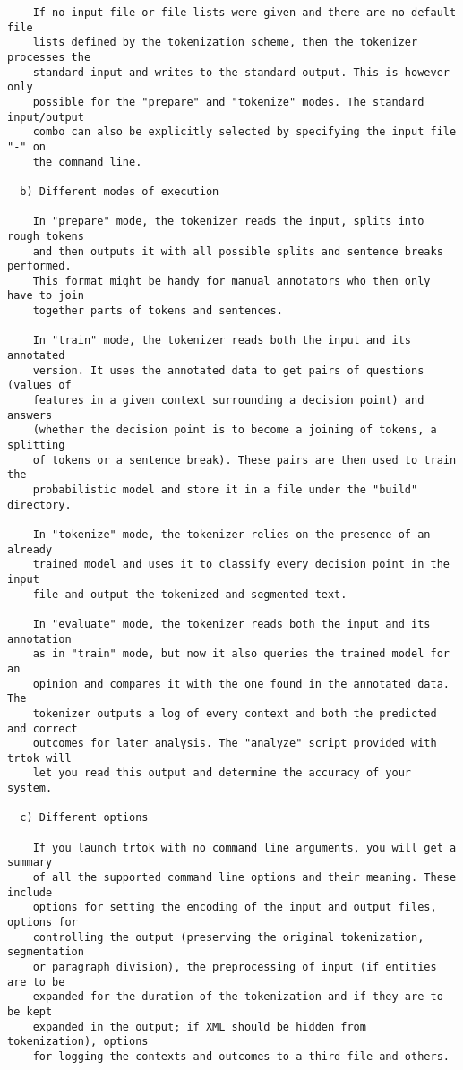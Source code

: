 \begin{tiny}
\begin{verbatim}
    If no input file or file lists were given and there are no default file
    lists defined by the tokenization scheme, then the tokenizer processes the
    standard input and writes to the standard output. This is however only
    possible for the "prepare" and "tokenize" modes. The standard input/output
    combo can also be explicitly selected by specifying the input file "-" on
    the command line.

  b) Different modes of execution

    In "prepare" mode, the tokenizer reads the input, splits into rough tokens
    and then outputs it with all possible splits and sentence breaks performed.
    This format might be handy for manual annotators who then only have to join
    together parts of tokens and sentences.

    In "train" mode, the tokenizer reads both the input and its annotated
    version. It uses the annotated data to get pairs of questions (values of
    features in a given context surrounding a decision point) and answers
    (whether the decision point is to become a joining of tokens, a splitting
    of tokens or a sentence break). These pairs are then used to train the
    probabilistic model and store it in a file under the "build" directory.

    In "tokenize" mode, the tokenizer relies on the presence of an already
    trained model and uses it to classify every decision point in the input
    file and output the tokenized and segmented text.

    In "evaluate" mode, the tokenizer reads both the input and its annotation
    as in "train" mode, but now it also queries the trained model for an
    opinion and compares it with the one found in the annotated data. The
    tokenizer outputs a log of every context and both the predicted and correct
    outcomes for later analysis. The "analyze" script provided with trtok will
    let you read this output and determine the accuracy of your system.

  c) Different options

    If you launch trtok with no command line arguments, you will get a summary
    of all the supported command line options and their meaning. These include
    options for setting the encoding of the input and output files, options for
    controlling the output (preserving the original tokenization, segmentation
    or paragraph division), the preprocessing of input (if entities are to be
    expanded for the duration of the tokenization and if they are to be kept
    expanded in the output; if XML should be hidden from tokenization), options
    for logging the contexts and outcomes to a third file and others.
\end{verbatim}
\end{tiny}
